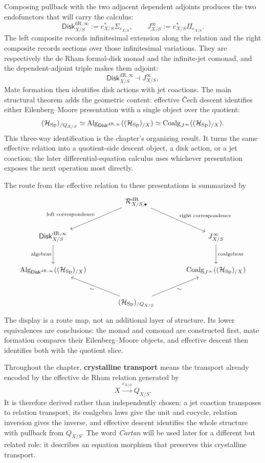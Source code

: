 Composing pullback with the two adjacent dependent adjoints produces the
two endofunctors that will carry the calculus:
\[
  \mathsf{Disk}^{\mathrm{dR},\infty}_{X/S}
  :=
  e_{X/S}^*\Sigma_{e_{X/S}},
  \qquad
  J^\infty_{X/S}
  :=
  e_{X/S}^*\Pi_{e_{X/S}}.
\]
The left composite records infinitesimal extension along the relation and the
right composite records sections over those infinitesimal variations. They are
respectively the de Rham formal-disk monad and the infinite-jet comonad, and
the dependent-adjoint triple makes them adjoint:
\[
  \mathsf{Disk}^{\mathrm{dR},\infty}_{X/S}
  \dashv
  J^\infty_{X/S},
\]
Mate formation then identifies disk actions with jet coactions. The main
structural theorem adds the geometric content: effective \v{C}ech descent
identifies either Eilenberg--Moore presentation with a single object over the
quotient:
\[
  (\mathcal H_{\operatorname{Sp}})_{/Q_{X/S}}
  \simeq
  \operatorname{Alg}_{\mathsf{Disk}^{\mathrm{dR},\infty}}
  ((\mathcal H_{\operatorname{Sp}})_{/X})
  \simeq
  \operatorname{Coalg}_{J^\infty}
  ((\mathcal H_{\operatorname{Sp}})_{/X}).
\]
This three-way identification is the chapter's organizing result. It turns the
same effective relation into a quotient-side descent object, a disk action, or
a jet coaction; the later differential-equation calculus uses whichever
presentation exposes the next operation most directly.

The route from the effective relation to these presentations is summarized by
\[
\begin{tikzcd}[column sep=large,row sep=large]
&
\mathcal R^{\mathrm{dR}}_{X/S,\bullet}
  \ar[dl,"{\text{left correspondence}}"']
  \ar[dr,"{\text{right correspondence}}"]
&
\\
\mathsf{Disk}^{\mathrm{dR},\infty}_{X/S}
  \ar[d,"{\text{algebras}}"']
&&
J^\infty_{X/S}
  \ar[d,"{\text{coalgebras}}"]
\\
\operatorname{Alg}_{\mathsf{Disk}^{\mathrm{dR},\infty}}
  ((\mathcal H_{\Sp})_{/X})
&&
\operatorname{Coalg}_{J^\infty}
  ((\mathcal H_{\Sp})_{/X})
\\
&
(\mathcal H_{\Sp})_{/Q_{X/S}}
  \ar[ul,"\sim"]
  \ar[ur,"\sim"']
&
\end{tikzcd}
\]
The display is a route map, not an additional layer of structure. Its lower
equivalences are conclusions: the monad and comonad are constructed first,
mate formation compares their Eilenberg--Moore objects, and effective descent
then identifies both with the quotient slice.

Throughout the chapter, \textbf{crystalline transport} means the transport
already encoded by the effective de Rham relation generated by
\[
  X\xrightarrow{e_{X/S}}Q_{X/S}.
\]
It is therefore derived rather than independently chosen: a jet coaction
transposes to relation transport, its coalgebra laws give the unit and cocycle,
relation inversion gives the inverse, and effective descent identifies the
whole structure with pullback from \(Q_{X/S}\). The word \emph{Cartan} will be
used later for a different but related role: it describes an equation morphism
that preserves this crystalline transport.

